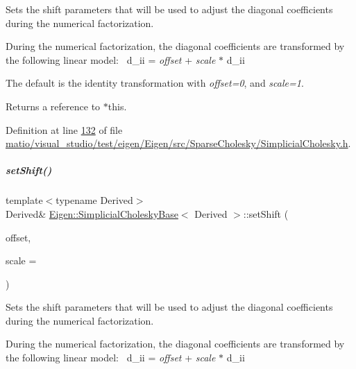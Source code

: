 Sets the shift parameters that will be used to adjust the diagonal coefficients during the numerical factorization.

During the numerical factorization, the diagonal coefficients are transformed by the following linear model\+:~\newline
{\ttfamily d\+\_\+ii} = {\itshape offset} + {\itshape scale} $\ast$ {\ttfamily d\+\_\+ii} 

The default is the identity transformation with {\itshape offset=0}, and {\itshape scale=1}.

\begin{DoxyReturn}{Returns}
a reference to {\ttfamily $\ast$this}. 
\end{DoxyReturn}


Definition at line \hyperlink{matio_2visual__studio_2test_2eigen_2_eigen_2src_2_sparse_cholesky_2_simplicial_cholesky_8h_source_l00132}{132} of file \hyperlink{matio_2visual__studio_2test_2eigen_2_eigen_2src_2_sparse_cholesky_2_simplicial_cholesky_8h_source}{matio/visual\+\_\+studio/test/eigen/\+Eigen/src/\+Sparse\+Cholesky/\+Simplicial\+Cholesky.\+h}.

\mbox{\label{group___sparse_cholesky___module_a362352f755101faaac59c1ed9d5e3559}} 
\subparagraph{\texorpdfstring{set\+Shift()}{setShift()}\hspace{0.1cm}{\footnotesize\ttfamily [2/2]}}
{\footnotesize\ttfamily template$<$typename Derived$>$ \\
Derived\& \hyperlink{group___sparse_cholesky___module_class_eigen_1_1_simplicial_cholesky_base}{Eigen\+::\+Simplicial\+Cholesky\+Base}$<$ Derived $>$\+::set\+Shift (\begin{DoxyParamCaption}\item[{const Real\+Scalar \&}]{offset,  }\item[{const Real\+Scalar \&}]{scale = {} }\end{DoxyParamCaption})\hspace{0.3cm}{\ttfamily [inline]}}

Sets the shift parameters that will be used to adjust the diagonal coefficients during the numerical factorization.

During the numerical factorization, the diagonal coefficients are transformed by the following linear model\+:~\newline
{\ttfamily d\+\_\+ii} = {\itshape offset} + {\itshape scale} $\ast$ {\ttfamily d\+\_\+ii} 

